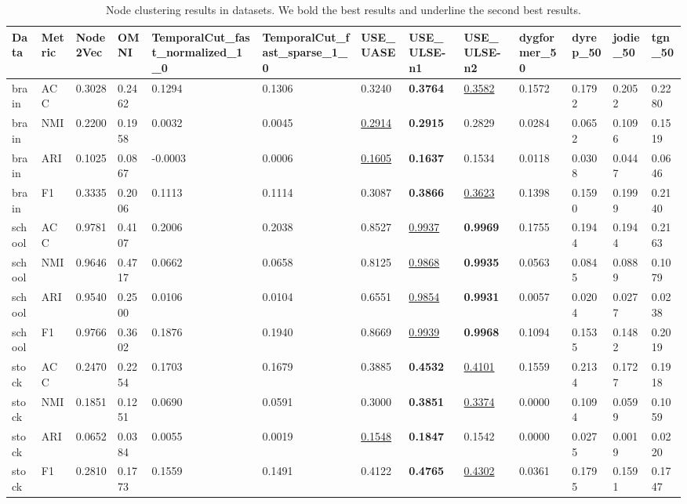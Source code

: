 \begin{table}
\caption{Node clustering results in datasets. We bold the best results and underline the second best results.}
\label{tab:clustering_results}
\begin{tabular}{lllllllllllll}
\toprule
Data & Metric & Node2Vec & OMNI & TemporalCut_fast_normalized_1_0 & TemporalCut_fast_sparse_1_0 & USE_UASE & USE_ULSE-n1 & USE_ULSE-n2 & dygformer_50 & dyrep_50 & jodie_50 & tgn_50 \\
\midrule
brain & ACC & 0.3028 & 0.2462 & 0.1294 & 0.1306 & 0.3240 & \textbf{0.3764} & \underline{0.3582} & 0.1572 & 0.1792 & 0.2052 & 0.2280 \\
brain & NMI & 0.2200 & 0.1958 & 0.0032 & 0.0045 & \underline{0.2914} & \textbf{0.2915} & 0.2829 & 0.0284 & 0.0652 & 0.1096 & 0.1519 \\
brain & ARI & 0.1025 & 0.0867 & -0.0003 & 0.0006 & \underline{0.1605} & \textbf{0.1637} & 0.1534 & 0.0118 & 0.0308 & 0.0447 & 0.0646 \\
brain & F1 & 0.3335 & 0.2006 & 0.1113 & 0.1114 & 0.3087 & \textbf{0.3866} & \underline{0.3623} & 0.1398 & 0.1590 & 0.1999 & 0.2140 \\
school & ACC & 0.9781 & 0.4107 & 0.2006 & 0.2038 & 0.8527 & \underline{0.9937} & \textbf{0.9969} & 0.1755 & 0.1944 & 0.1944 & 0.2163 \\
school & NMI & 0.9646 & 0.4717 & 0.0662 & 0.0658 & 0.8125 & \underline{0.9868} & \textbf{0.9935} & 0.0563 & 0.0845 & 0.0889 & 0.1079 \\
school & ARI & 0.9540 & 0.2500 & 0.0106 & 0.0104 & 0.6551 & \underline{0.9854} & \textbf{0.9931} & 0.0057 & 0.0204 & 0.0277 & 0.0238 \\
school & F1 & 0.9766 & 0.3602 & 0.1876 & 0.1940 & 0.8669 & \underline{0.9939} & \textbf{0.9968} & 0.1094 & 0.1535 & 0.1482 & 0.2019 \\
stock & ACC & 0.2470 & 0.2254 & 0.1703 & 0.1679 & 0.3885 & \textbf{0.4532} & \underline{0.4101} & 0.1559 & 0.2134 & 0.1727 & 0.1918 \\
stock & NMI & 0.1851 & 0.1251 & 0.0690 & 0.0591 & 0.3000 & \textbf{0.3851} & \underline{0.3374} & 0.0000 & 0.1094 & 0.0599 & 0.1059 \\
stock & ARI & 0.0652 & 0.0384 & 0.0055 & 0.0019 & \underline{0.1548} & \textbf{0.1847} & 0.1542 & 0.0000 & 0.0275 & 0.0019 & 0.0220 \\
stock & F1 & 0.2810 & 0.1773 & 0.1559 & 0.1491 & 0.4122 & \textbf{0.4765} & \underline{0.4302} & 0.0361 & 0.1795 & 0.1591 & 0.1747 \\

\end{tabular}
\end{table}
